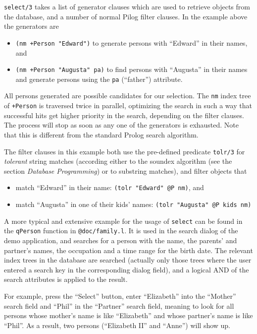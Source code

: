\texttt{select/3} takes a list of generator clauses which are used to retrieve
objects from the database, and a number of normal Pilog filter clauses.
In the example above the generators are

\begin{itemize}
\item \texttt{(nm +Person "Edward")} to generate persons with ``Edward'' in their
   names, and
\item \texttt{(nm +Person "Augusta" pa)} to find persons with ``Augusta'' in their
   names and generate persons using the \texttt{pa} (``father'') attribute.
\end{itemize}

All persons generated are possible candidates for our selection. The
\texttt{nm} index tree of \texttt{+Person} is traversed twice in parallel, optimizing
the search in such a way that successful hits get higher priority in the
search, depending on the filter clauses. The process will stop as soon
as any one of the generators is exhausted. Note that this is different
from the standard Prolog search algorithm.

The filter clauses in this example both use the pre-defined predicate
\texttt{tolr/3} for \emph{tolerant} string matches (according either to the soundex
algorithm (see the section \emph{Database Programming}) or to
substring matches), and filter objects that

\begin{itemize}
\item match ``Edward'' in their name: \texttt{(tolr "Edward" @P nm)}, and
\item match ``Augusta'' in one of their kids' names:
   \texttt{(tolr "Augusta" @P kids nm)}
\end{itemize}

A more typical and extensive example for the usage of \texttt{select} can be
found in the \texttt{qPerson} function in \texttt{@doc/family.l}. It is used in the
search dialog of the demo application, and searches for a person with
the name, the parents' and partner's names, the occupation and a time
range for the birth date. The relevant index trees in the database are
searched (actually only those trees where the user entered a search key
in the corresponding dialog field), and a logical AND of the search
attributes is applied to the result.

For example, press the ``Select'' button, enter ``Elizabeth'' into the
``Mother'' search field and ``Phil'' in the ``Partner'' search field, meaning
to look for all persons whose mother's name is like ``Elizabeth'' and
whose partner's name is like ``Phil''. As a result, two persons
(``Elizabeth II'' and ``Anne'') will show up.

